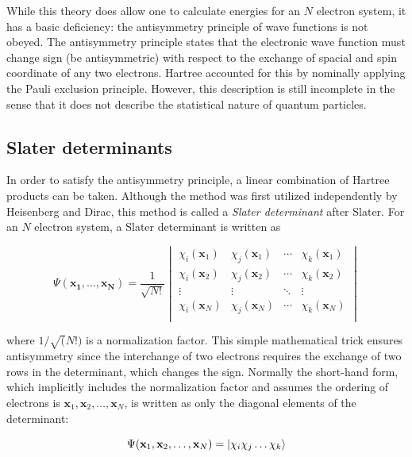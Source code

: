 \begin{doublespace}
While this theory does allow one to calculate energies for an $N$ electron
system, it has a basic deficiency: the antisymmetry principle of wave functions
is not obeyed. The antisymmetry principle states that the electronic wave
function must change sign (be antisymmetric) with respect to the exchange of
spacial and spin coordinate of any two electrons. Hartree accounted for this by
nominally applying the Pauli exclusion principle. However, this description is still
incomplete in the sense that it does not describe the statistical nature of
quantum particles.

\subsection{Slater determinants}

In order to satisfy the antisymmetry principle, a linear combination of Hartree
products can be taken. Although the method was first utilized independently by
Heisenberg\cite{Heisenberg1926} and Dirac,\cite{Dirac1926} this method is
called a \emph{Slater determinant} after Slater.\cite{Slater1929} For an $N$
electron system, a Slater determinant is written as

\begin{equation}
\Psi(\mathbf{x_1},\ldots,\mathbf{x_N}) = \frac{1}{\sqrt{N!}}
\begin{vmatrix}
\chi_i(\mathbf{x}_1) & \chi_j(\mathbf{x}_1) & \cdots & \chi_k(\mathbf{x}_1) \\
\chi_i(\mathbf{x}_2) & \chi_j(\mathbf{x}_2) & \cdots & \chi_k(\mathbf{x}_2) \\
\vdots & \vdots & \ddots & \vdots \\
\chi_i(\mathbf{x}_N) & \chi_j(\mathbf{x}_N) & \cdots & \chi_k(\mathbf{x}_N) \\
\end{vmatrix}
\end{equation}

\noindent where $1/\sqrt(N!)$ is a normalization factor. This simple
mathematical trick ensures antisymmetry since the interchange of two electrons
requires the exchange of two rows in the determinant, which changes the sign.
Normally the short-hand form, which implicitly includes the normalization
factor and assumes the ordering of electrons is
$\mathbf{x}_1,\mathbf{x}_2,\dots,\mathbf{x}_N$, is written as only the diagonal
elements of the determinant:

\begin{equation}
  \Psi(\mathbf{x}_1,\mathbf{x}_2,\dots,\mathbf{x}_N) = \ket{\chi_i\chi_j\dots\chi_k}
\end{equation}


\end{doublespace}
